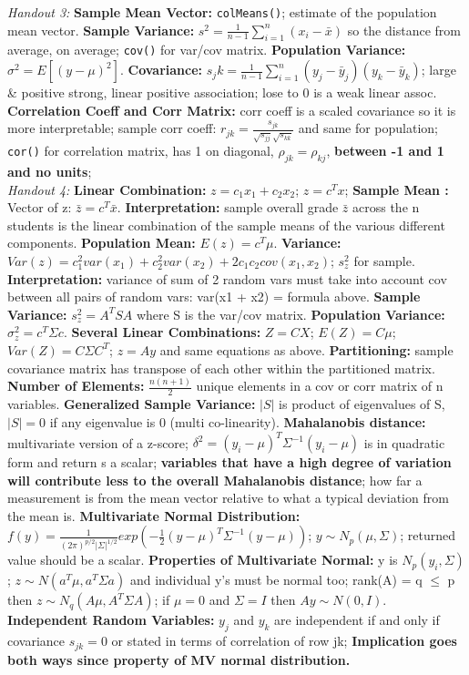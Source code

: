 \documentclass[9pt]{extarticle}
\begin{document}
\textit{Handout 3:}
\textbf{Sample Mean Vector:} \texttt{colMeans()}; estimate of the population 
mean vector.
\textbf{Sample Variance:} $s^2 = \frac{1}{n-1} \sum_{i=1}^n (x_i - \bar{x})$ so 
the distance from average, on average; \texttt{cov()} for var/cov matrix.
\textbf{Population Variance:} $\sigma^2 = E[(y - \mu)^2]$.
\textbf{Covariance:} $s_jk = \frac{1}{n-1} \sum_{i=1}^n (y_{j} - \bar{y}_j)
(y_{k} - \bar{y}_k)$; large \& positive strong, linear positive association; 
lose to 0 is a weak linear assoc.
\textbf{Correlation Coeff and Corr Matrix:} corr coeff is a scaled covariance so 
it is more interpretable; sample corr coeff: $r_{jk} = \frac{s_{jk}}{
    \sqrt{s_{jj}}\sqrt{s_{kk}}}$ and same for population; \texttt{cor()} for
correlation matrix, has 1 on diagonal, $\rho_{jk} = \rho_{kj}$, \textbf{between
-1 and 1 and no units};\\

\textit{Handout 4:}
\textbf{Linear Combination:} $z = c_1x_1 + c_2x_2$; $z = c^Tx$; 
\textbf{Sample Mean :} Vector of z: $\bar{z} = c^T\bar{x}$. 
\textbf{Interpretation:} sample overall grade $\bar{z}$ across the n students 
is the linear combination of the sample means of the various different 
components.
\textbf{Population Mean:} $E(z) = c^T\mu$.
\textbf{Variance:} $Var(z) = c_1^2var(x_1) + c_2^2var(x_2) + 2c_1c_2 
cov(x_1, x_2)$; $s_z^2$ for sample.
\textbf{Interpretation:} variance of sum of 2 random vars must take into 
account cov between all pairs of random vars: var(x1 + x2) = formula above.
\textbf{Sample Variance:} $s_z^2 = A^TSA$ where S is the var/cov matrix.
\textbf{Population Variance:} $\sigma_z^2 = c^T\Sigma c$.
\textbf{Several Linear Combinations:} $Z = CX$; $E(Z) = C\mu$; $Var(Z) =
C\Sigma C^T$; $z = Ay$ and same equations as above.
\textbf{Partitioning:} sample covariance matrix has transpose of each other 
within the partitioned matrix.
\textbf{Number of Elements:} $\frac{n(n+1)}{2}$ unique elements in a 
cov or corr matrix of n variables.
\textbf{Generalized Sample Variance:} $|S|$ is product of eigenvalues of S,  
$|S| = 0$ if any eigenvalue is 0 (multi co-linearity).
\textbf{Mahalanobis distance:} multivariate version of a z-score;
$\delta^2 = (y_i - \mu)^T\Sigma^{-1}(y_i - \mu)$ is in quadratic form and 
return s a scalar; \textbf{variables that have a high degree of variation
will contribute less to the overall Mahalanobis distance}; how far a 
measurement is from the mean vector relative to what a typical deviation from 
the mean is.
\textbf{Multivariate Normal Distribution:} $f(y) = \frac{1}{(2\pi)^{p/2}|
\Sigma|^{1/2}}exp(-\frac{1}{2}(y - \mu)^T\Sigma^{-1}(y - \mu))$; 
$y \sim N_p(\mu, \Sigma)$; returned value should be a scalar.
\textbf{Properties of Multivariate Normal:} y is $N_p(y_i, \Sigma)$; 
$z \sim N(a^T\mu, a^T\Sigma a)$ and individual y's must be normal too; 
rank(A) = q $\leq$ p then $z \sim N_q(A\mu, A^T\Sigma A)$; if $\mu = 0$ and 
$\Sigma = I$ then $Ay \sim N(0, I)$.
\textbf{Independent Random Variables:} $y_j$ and $y_k$ are independent if
and only if covariance $s_{jk} = 0$ or stated in terms of correlation of row jk;
\textbf{Implication goes both ways since property of MV normal distribution.} \\
\end{document}

